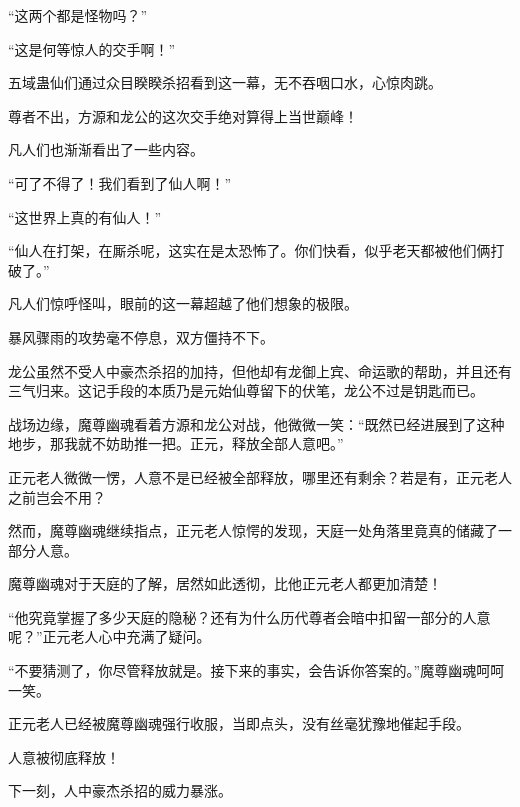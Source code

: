 \begin{this_body}
“这两个都是怪物吗？”

“这是何等惊人的交手啊！”

五域蛊仙们通过众目睽睽杀招看到这一幕，无不吞咽口水，心惊肉跳。

尊者不出，方源和龙公的这次交手绝对算得上当世巅峰！

凡人们也渐渐看出了一些内容。

“可了不得了！我们看到了仙人啊！”

“这世界上真的有仙人！”

“仙人在打架，在厮杀呢，这实在是太恐怖了。你们快看，似乎老天都被他们俩打破了。”

凡人们惊呼怪叫，眼前的这一幕超越了他们想象的极限。

暴风骤雨的攻势毫不停息，双方僵持不下。

龙公虽然不受人中豪杰杀招的加持，但他却有龙御上宾、命运歌的帮助，并且还有三气归来。这记手段的本质乃是元始仙尊留下的伏笔，龙公不过是钥匙而已。

战场边缘，魔尊幽魂看着方源和龙公对战，他微微一笑：“既然已经进展到了这种地步，那我就不妨助推一把。正元，释放全部人意吧。”

正元老人微微一愣，人意不是已经被全部释放，哪里还有剩余？若是有，正元老人之前岂会不用？

然而，魔尊幽魂继续指点，正元老人惊愕的发现，天庭一处角落里竟真的储藏了一部分人意。

魔尊幽魂对于天庭的了解，居然如此透彻，比他正元老人都更加清楚！

“他究竟掌握了多少天庭的隐秘？还有为什么历代尊者会暗中扣留一部分的人意呢？”正元老人心中充满了疑问。

“不要猜测了，你尽管释放就是。接下来的事实，会告诉你答案的。”魔尊幽魂呵呵一笑。

正元老人已经被魔尊幽魂强行收服，当即点头，没有丝毫犹豫地催起手段。

人意被彻底释放！

下一刻，人中豪杰杀招的威力暴涨。

\end{this_body}

